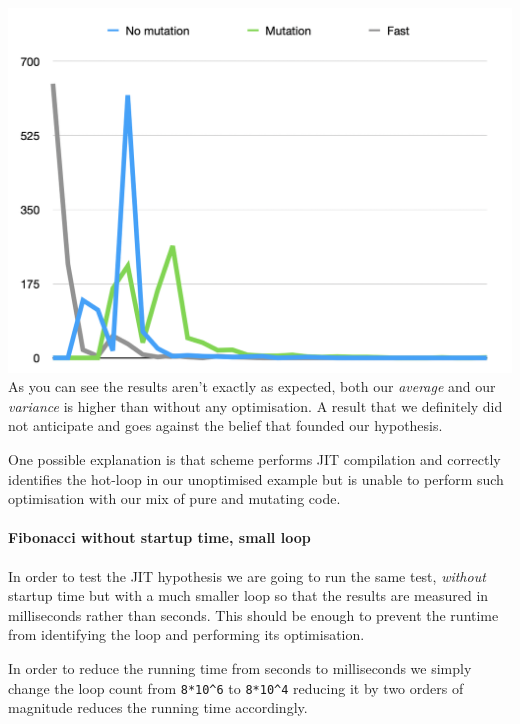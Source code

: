 \documentclass[
]{article}
\begin{document}
\includegraphics{Screenshot 2020-08-25 at 17.59.34.png} As you can see
the results aren't exactly as expected, both our \emph{average} and our
\emph{variance} is higher than without any optimisation. A result that
we definitely did not anticipate and goes against the belief that
founded our hypothesis.

One possible explanation is that scheme performs JIT compilation and
correctly identifies the hot-loop in our unoptimised example but is
unable to perform such optimisation with our mix of pure and mutating
code.

\hypertarget{fibonacci-without-startup-time-small-loop}{%
\paragraph{Fibonacci without startup time, small
loop}\label{fibonacci-without-startup-time-small-loop}}

In order to test the JIT hypothesis we are going to run the same test,
\emph{without} startup time but with a much smaller loop so that the
results are measured in milliseconds rather than seconds. This should be
enough to prevent the runtime from identifying the loop and performing
its optimisation.

In order to reduce the running time from seconds to milliseconds we
simply change the loop count from \texttt{8*10\^{}6} to
\texttt{8*10\^{}4} reducing it by two orders of magnitude reduces the
running time accordingly.
\end{document}
